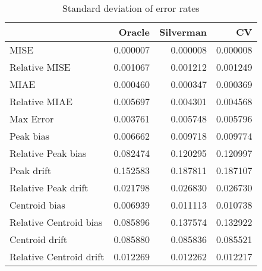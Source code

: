 \begin{table}[ht]
\centering
\begin{tabular}{lrrr}
  \hline
 & Oracle & Silverman & CV \\ 
  \hline
MISE & 0.000007 & 0.000008 & 0.000008 \\ 
  Relative MISE & 0.001067 & 0.001212 & 0.001249 \\ 
  MIAE & 0.000460 & 0.000347 & 0.000369 \\ 
  Relative MIAE & 0.005697 & 0.004301 & 0.004568 \\ 
  Max Error & 0.003761 & 0.005748 & 0.005796 \\ 
  Peak bias & 0.006662 & 0.009718 & 0.009774 \\ 
  Relative Peak bias & 0.082474 & 0.120295 & 0.120997 \\ 
  Peak drift & 0.152583 & 0.187811 & 0.187107 \\ 
  Relative Peak drift & 0.021798 & 0.026830 & 0.026730 \\ 
  Centroid bias & 0.006939 & 0.011113 & 0.010738 \\ 
  Relative Centroid bias & 0.085896 & 0.137574 & 0.132922 \\ 
  Centroid drift & 0.085880 & 0.085836 & 0.085521 \\ 
  Relative Centroid drift & 0.012269 & 0.012262 & 0.012217 \\ 
   \hline
\end{tabular}
\caption{Standard deviation of error rates} 
\label{tbl:stddev_error_rates}
\end{table}
